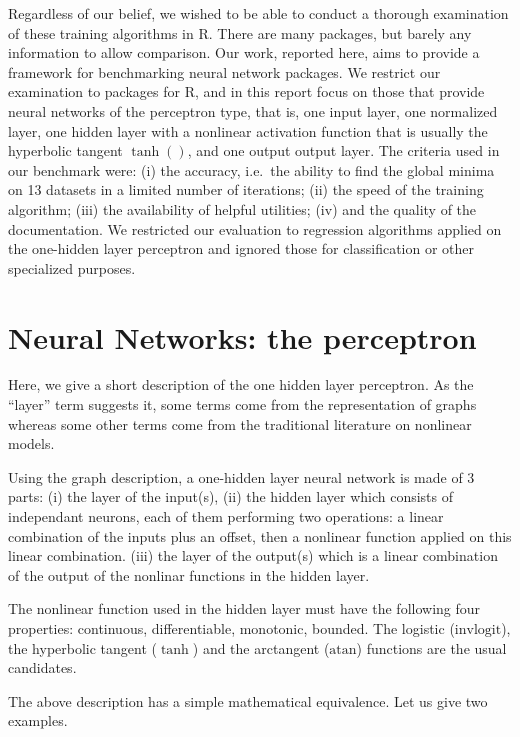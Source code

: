 Regardless of our belief, we wished to be able to conduct a thorough
examination of these training algorithms in R. There are many packages,
but barely any information to allow comparison. Our work, reported here,
aims to provide a framework for benchmarking neural network packages. We
restrict our examination to packages for R, and in this report focus on
those that provide neural networks of the perceptron type, that is, one
input layer, one normalized layer, one hidden layer with a nonlinear
activation function that is usually the hyperbolic tangent \(\tanh()\),
and one output output layer. The criteria used in our benchmark were:
(i) the accuracy, i.e.~the ability to find the global minima on 13
datasets in a limited number of iterations; (ii) the speed of the
training algorithm; (iii) the availability of helpful utilities; (iv)
and the quality of the documentation. We restricted our evaluation to
regression algorithms applied on the one-hidden layer perceptron and
ignored those for classification or other specialized purposes.

\hypertarget{neural-networks-the-perceptron}{%
\section{Neural Networks: the
perceptron}\label{neural-networks-the-perceptron}}

Here, we give a short description of the one hidden layer perceptron. As
the ``layer'' term suggests it, some terms come from the representation
of graphs whereas some other terms come from the traditional literature
on nonlinear models.

Using the graph description, a one-hidden layer neural network is made
of 3 parts: (i) the layer of the input(s), (ii) the hidden layer which
consists of independant neurons, each of them performing two operations:
a linear combination of the inputs plus an offset, then a nonlinear
function applied on this linear combination. (iii) the layer of the
output(s) which is a linear combination of the output of the nonlinar
functions in the hidden layer.

The nonlinear function used in the hidden layer must have the following
four properties: continuous, differentiable, monotonic, bounded. The
logistic (\(\text{invlogit}\)), the hyperbolic tangent (\(\tanh\)) and
the arctangent (\(\text{atan}\)) functions are the usual candidates.

The above description has a simple mathematical equivalence. Let us give
two examples.

